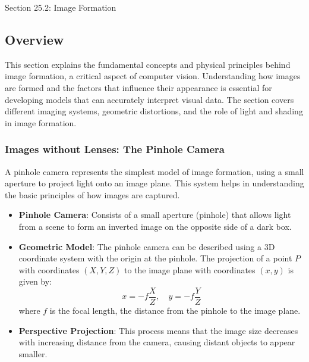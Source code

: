 \begin{notes}{Section 25.2: Image Formation}
    \subsection*{Overview}

    This section explains the fundamental concepts and physical principles behind image formation, a critical aspect of computer vision. Understanding how images are formed and the factors that influence 
    their appearance is essential for developing models that can accurately interpret visual data. The section covers different imaging systems, geometric distortions, and the role of light and shading in 
    image formation.
    
    \subsubsection*{Images without Lenses: The Pinhole Camera}
    
    A pinhole camera represents the simplest model of image formation, using a small aperture to project light onto an image plane. This system helps in understanding the basic principles of how images are 
    captured.
    
    \begin{highlight}
    
        \begin{itemize}
            \item \textbf{Pinhole Camera}: Consists of a small aperture (pinhole) that allows light from a scene to form an inverted image on the opposite side of a dark box.
            \item \textbf{Geometric Model}: The pinhole camera can be described using a 3D coordinate system with the origin at the pinhole. The projection of a point \( P \) with coordinates \((X, Y, Z)\) 
            to the image plane with coordinates \((x, y)\) is given by:
            \[
            x = -f \frac{X}{Z}, \quad y = -f \frac{Y}{Z}
            \]
            where \( f \) is the focal length, the distance from the pinhole to the image plane.
            \item \textbf{Perspective Projection}: This process means that the image size decreases with increasing distance from the camera, causing distant objects to appear smaller.
        \end{itemize}
    
    \end{highlight}
    

\end{notes}
